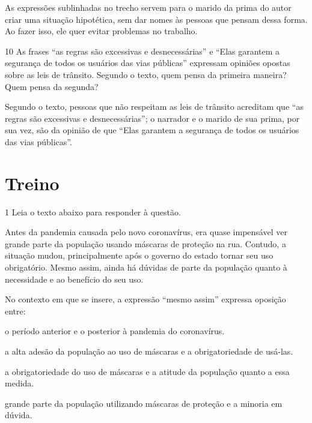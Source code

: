 \reduline{} As expressões sublinhadas no trecho servem para o marido da prima
do autor criar uma situação hipotética, sem dar nomes às pessoas que pensam
dessa forma. Ao fazer isso, ele quer evitar problemas no trabalho. 

\num{10} As frases ``as regras são excessivas e desnecessárias'' e 
``Elas garantem a segurança de todos os usuários das vias públicas'' expressam
opiniões opostas sobre as leis de trânsito. Segundo o texto, quem pensa
da primeira maneira? Quem pensa da segunda?

\reduline{} Segundo o texto, pessoas que não respeitam as leis de trânsito 
acreditam que ``as regras são excessivas e desnecessárias''; o narrador e 
o marido de sua prima, por sua vez, são da opinião de que ``Elas garantem a
segurança de todos os usuários das vias públicas''.

\section*{Treino}

\num{1} Leia o texto abaixo para responder à questão.

\begin{myquote}

Antes da pandemia causada pelo novo coronavírus, era quase impensável
ver grande parte da população usando máscaras de proteção na rua.
Contudo, a situação mudou, principalmente após o governo do estado tornar
seu uso obrigatório. Mesmo assim, ainda há dúvidas de parte da população
quanto à necessidade e ao benefício do seu uso.


\end{myquote}

No contexto em que se insere, a expressão ``mesmo assim'' expressa oposição entre:

\begin{escolha}

  \item o período anterior e o posterior à pandemia do coronavírus.

  \item a alta adesão da população ao uso de máscaras e a obrigatoriedade de usá-las.

  \item a obrigatoriedade do uso de máscaras e a atitude da população quanto a essa medida.

  \item grande parte da população utilizando máscaras de proteção e a minoria em dúvida.

\end{escolha}

